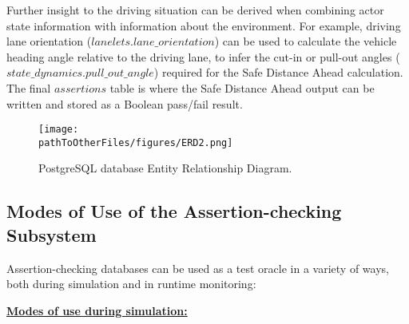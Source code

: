 Further insight to the driving situation can be derived when combining actor state information with information about the environment. For example, driving lane orientation ($lanelets.lane\_orientation$) can be used to calculate the vehicle heading angle relative to the driving lane, to infer the cut-in or pull-out angles ($state\_dynamics.pull\_out\_angle$) required for the Safe Distance Ahead calculation. The final $assertions$ table is where the Safe Distance Ahead output can be written and stored as a Boolean pass/fail result.

\begin{figure}
    \centering
    \texttt{[image: \\pathToOtherFiles/figures/ERD2.png]}
    \caption{PostgreSQL database Entity Relationship Diagram.}
    \label{fig:erd}
\end{figure}


\subsection{Modes of Use of the Assertion-checking Subsystem} \label{Assertions_at_Sim_Time} \label{assertions_at_run_time}

Assertion-checking databases can be used as a test oracle %
in a variety of ways, both during simulation and in runtime monitoring:


\underline{\textbf{Modes of use during simulation:}}

